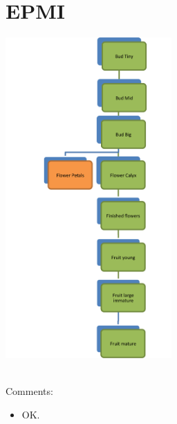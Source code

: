 \documentclass[10pt]{book} %
\begin{document}
\section{EPMI}
\begin{multicols}{2}
\includegraphics[width=2.5in]{EPMI.png}
\vfill
\columnbreak

\\Comments:
\begin{itemize}
\item OK.
\end{itemize}
\end{multicols}

\clearpage
\newpage
\end{document}
